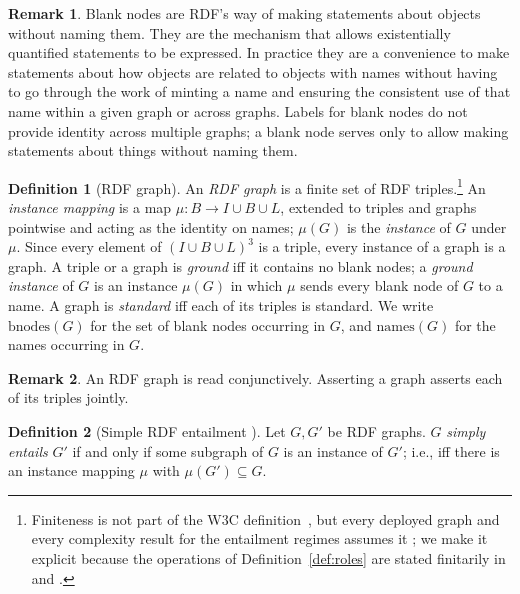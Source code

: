 \documentclass[12pt]{article}
\theoremstyle{definition}
\newtheorem{definition}{Definition}
\newtheorem{remark}{Remark}
\begin{document}
\begin{remark}
\label{rem:bnodes}
Blank nodes are RDF's way of making statements about objects without naming them. They are the mechanism that allows existentially quantified statements to be expressed. In practice they are a convenience to make statements about how objects are related to objects with names without having to go through the work of minting a name and ensuring the consistent use of that name within a given graph or across graphs. Labels for blank nodes do not provide identity across multiple graphs; a blank node serves only to allow making statements about things without naming them.
\end{remark}

\begin{definition}[RDF graph]
\label{def:rdfgraph}
An \textit{RDF graph} is a finite set of RDF triples.\footnote{Finiteness is not part of the W3C definition~\citep{cyganiak2014rdf}, but every deployed graph and every complexity result for the entailment regimes assumes it \citep{terhorst2005completeness}; we make it explicit because the operations of Definition~\ref{def:roles} are stated finitarily in \citet[Defs.~67, 69]{hlobil2025reasons} and \citet[Def.~10]{hlobil2026firstorder}.} An \textit{instance mapping} is a map $\mu: B \rightarrow I \cup B \cup L$, extended to triples and graphs pointwise and acting as the identity on names; $\mu(G)$ is the \textit{instance} of $G$ under $\mu$. Since every element of $(I \cup B \cup L)^{3}$ is a triple, every instance of a graph is a graph. A triple or a graph is \textit{ground} iff it contains no blank nodes; a \textit{ground instance} of $G$ is an instance $\mu(G)$ in which $\mu$ sends every blank node of $G$ to a name. A graph is \textit{standard} iff each of its triples is standard. We write $\mathrm{bnodes}(G)$ for the set of blank nodes occurring in $G$, and $\mathrm{names}(G)$ for the names occurring in $G$.
\end{definition}

\begin{remark}
\label{rem:graphreading}
An RDF graph is read conjunctively. Asserting a graph asserts each of its triples jointly.
\end{remark}

\begin{definition}[Simple RDF entailment \citep{hayes2014rdf,terhorst2005completeness}]
\label{def:simpleentailment}
Let $G, G'$ be RDF graphs. $G$ \textit{simply entails} $G'$ if and only if some subgraph of $G$ is an instance of $G'$; i.e., iff there is an instance mapping $\mu$ with $\mu(G') \subseteq G$.
\end{definition}
\end{document}
